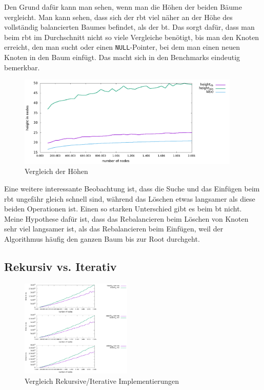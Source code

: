 \documentclass[11pt]{article}
\newcommand{\lstin}[1]{\lstinline[language=C]{#1}}
\begin{document}
Den Grund dafür kann man sehen, wenn man die Höhen der beiden Bäume vergleicht. Man kann sehen, dass sich der \gls{rbt} viel näher an der Höhe des vollständig balancierten Baumes befindet, 
als der \gls{bt}. Das sorgt dafür, dass man beim \gls{rbt} im Durchschnitt nicht so viele Vergleiche benötigt, bis man den Knoten erreicht, den man sucht oder einen \lstin{NULL}-Pointer, bei dem 
man einen neuen Knoten in den Baum einfügt. Das macht sich in den Benchmarks eindeutig bemerkbar.  

\begin{figure}[h]
  \centering
  \includegraphics[width=400px]{../benchmark/compare_height.png}
  \caption{Vergleich der Höhen}
\end{figure}

Eine weitere interessante Beobachtung ist, dass die Suche und das Einfügen beim \gls{rbt} ungefähr gleich schnell sind, während das Löschen etwas langsamer als diese beiden Operationen ist.
Einen so starken Unterschied gibt es beim \gls{bt} nicht. Meine Hypothese dafür ist, dass das Rebalancieren beim Löschen von Knoten sehr viel langsamer ist, als das Rebalancieren beim Einfügen, weil
der Algorithmus häufig den ganzen Baum bis zur Root durchgeht. 

\subsection{Rekursiv vs. Iterativ} \label{ben2}

\begin{figure}
  \centering
  \includegraphics[width=200px]{../benchmark/compare_insert.png}
  \caption{Vergleich Rekursive/Iterative Implementierungen}
  \label{bir}
\end{figure}
\end{document}
